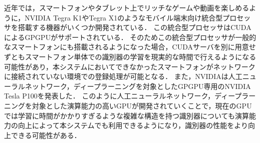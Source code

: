 近年では，スマートフォンやタブレット上でリッチなゲームや動画を楽しめるように，NVIDIA Tegra K1やTegra X1のようなモバイル端末向け統合型プロセッサを搭載する機器がいくつか開発されている．
この統合型プロセッサはCUDAによるGPGPUがサポートされている．
そのためこの統合型プロセッサが一般的なスマートフォンにも搭載されるようになった場合，CUDAサーバを別に用意せずともスマートフォン単体での識別器の学習を現実的な時間で行えるようになる可能性があり，本システムにおいてできなかったスマートフォンがネットワークに接続されていない環境での登録処理が可能となる．
また，NVIDIAは人工ニューラルネットワーク，ディープラーニングを対象としたGPGPU専用のNVIDIA Tesla P100を発表した．
このように人工ニューラルネットワーク，ディープラーニングを対象とした演算能力の高いGPUが開発されていくことで，現在のGPUでは学習に時間がかかりすぎるような複雑な構造を持つ識別器についても演算能力の向上によって本システムでも利用できるようになり，識別器の性能をより向上できる可能性がある．
